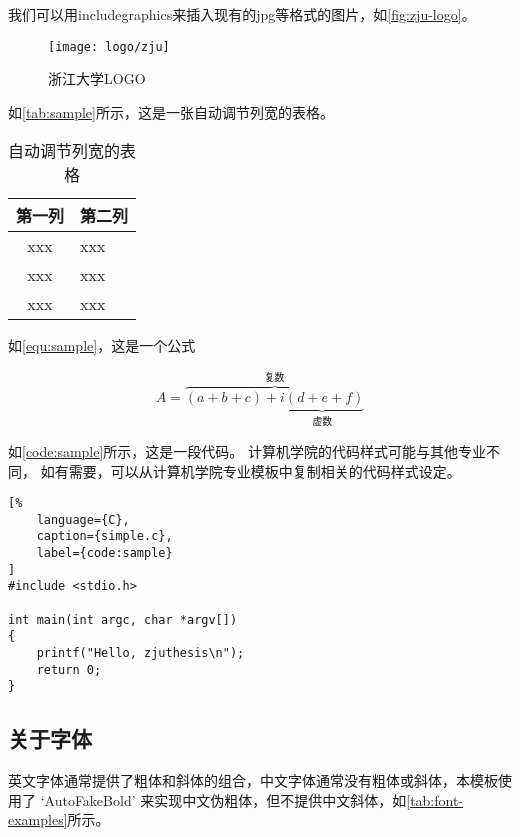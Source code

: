 \par 我们可以用includegraphics来插入现有的jpg等格式的图片，如\autoref{fig:zju-logo}。

\begin{figure}[ht]
    \centering
    \texttt{[image: logo/zju]}
    \caption{\label{fig:zju-logo}浙江大学LOGO}
\end{figure}

\par 如\autoref{tab:sample}所示，这是一张自动调节列宽的表格。

\begin{table}[ht]
    \caption{\label{tab:sample}自动调节列宽的表格}
    \begin{tabularx}{\linewidth}{|c|X<{\centering}|}
        \hline
        第一列 & 第二列 \\ \hline
        xxx & xxx \\ \hline
        xxx & xxx \\ \hline
        xxx & xxx \\ \hline
    \end{tabularx}
\end{table}

\par 如\autoref{equ:sample}，这是一个公式

\begin{equation}
    \label{equ:sample}
    A=\overbrace{(a+b+c)+\underbrace{i(d+e+f)}_{\text{虚数}}}^{\text{复数}}
\end{equation}

\par 如\autoref{code:sample}所示，这是一段代码。
计算机学院的代码样式可能与其他专业不同，
如有需要，可以从计算机学院专业模板中复制相关的代码样式设定。

\begin{lstlisting}[%
    language={C},
    caption={simple.c},
    label={code:sample}
]
#include <stdio.h>

int main(int argc, char *argv[])
{
    printf("Hello, zjuthesis\n");
    return 0;
}
\end{lstlisting}

\subsection{关于字体}

英文字体通常提供了粗体和斜体的组合，中文字体通常没有粗体或斜体，本模板使用了 `AutoFakeBold' 来实现中文伪粗体，但不提供中文斜体，如\autoref{tab:font-examples}所示。

